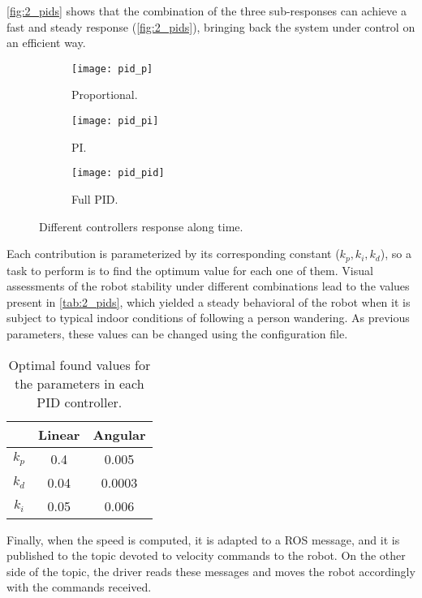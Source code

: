 \autoref{fig:2_pids} shows that the combination of the three sub-responses can achieve a fast and steady response (\autoref{fig:2_pids}), bringing back the system under control on an efficient way.

\begin{figure}[h]
	\centering
	\begin{subfigure}[b]{0.3\linewidth}
		\centering
		\texttt{[image: pid\_p]}
		\caption{Proportional.}
		\label{fig:2_pid_p}
	\end{subfigure}
	\hfill
	\begin{subfigure}[b]{0.3\linewidth}
		\centering
		\texttt{[image: pid\_pi]}
		\caption{PI.}
		\label{fig:2_pid_pi}
	\end{subfigure}
	\hfill
	\begin{subfigure}[b]{0.3\linewidth}
		\centering
		\texttt{[image: pid\_pid]}
		\caption{Full PID.}
		\label{fig:2_pid_pid}
	\end{subfigure}
	\caption{Different controllers response along time.}
	\label{fig:2_pids}		 	
\end{figure}

Each contribution is parameterized by its corresponding constant ($k_p, k_i, k_d$), so a task to perform is to find the optimum value for each one of them. Visual assessments of the robot stability under different combinations lead to the values present in \autoref{tab:2_pids}, which yielded a steady behavioral of the robot when it is subject to typical indoor conditions of following a person wandering. As previous parameters, these values can be changed using the configuration file.

\begin{table}[h]
	\centering
	\begin{tabular}{|c|c|c|}
		\hline
		\textbf{} & \textbf{Linear} & \textbf{Angular} \\ \hline
		$k_p$     & 0.4               & 0.005               \\ \hline
		$k_d$     & 0.04              & 0.0003              \\ \hline
		$k_i$     & 0.05              & 0.006               \\ \hline
	\end{tabular}
	\caption{Optimal found values for the parameters in each PID controller.}
	\label{tab:2_pids}
\end{table}

Finally, when the speed is computed, it is adapted to a ROS message, and it is published to the topic devoted to velocity commands to the robot. On the other side of the topic, the driver reads these messages and moves the robot accordingly with the commands received.\\

